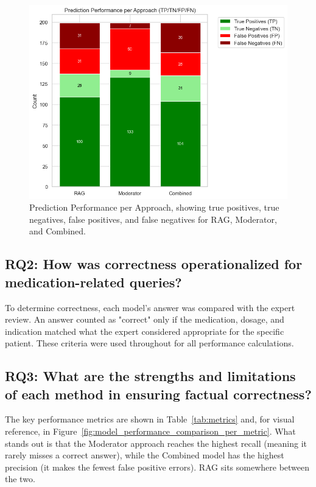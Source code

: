 \begin{figure}[ht]
  \centering
  \includegraphics[width=0.95\linewidth]{figures/prediction_performance_per_approach.png}
  \caption{Prediction Performance per Approach, showing true positives, true negatives, false positives, and false negatives for RAG, Moderator, and Combined.}
  \label{fig:prediction_performance_bar}
\end{figure}

\subsection{RQ2: How was correctness operationalized for medication-related queries?}

To determine correctness, each model's answer was compared with the expert review. An answer counted as "correct" only if the medication, dosage, and indication matched what the expert considered appropriate for the specific patient. These criteria were used throughout for all performance calculations.

\subsection{RQ3: What are the strengths and limitations of each method in ensuring factual correctness?}

The key performance metrics are shown in Table~\ref{tab:metrics} and, for visual reference, in Figure~\ref{fig:model_performance_comparison_per_metric}. What stands out is that the Moderator approach reaches the highest recall (meaning it rarely misses a correct answer), while the Combined model has the highest precision (it makes the fewest false positive errors). RAG sits somewhere between the two.

